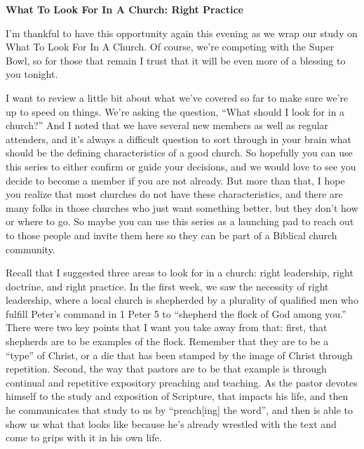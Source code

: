 \documentclass[letterpaper, 12pt]{article}
\begin{document}
    \thispagestyle{empty}

    \begin{center}

        \textbf{\large{What To Look For In A Church: Right Practice}}

    \end{center}

    I'm thankful to have this opportunity again this evening as we wrap
    our study on What To Look For In A Church. Of course, we're
    competing with the Super Bowl, so for those that remain I trust that
    it will be even more of a blessing to you tonight. 

    I want to review a little bit about what we've covered so far to
    make sure we're up to speed on things. We're asking the question,
    ``What should I look for in a church?'' And I noted that we have
    several new members as well as regular attenders, and it's always a
    difficult question to sort through in your brain what should be the
    defining characteristics of a good church. So hopefully you can use
    this series to either confirm or guide your decisions, and we would
    love to see you decide to become a member if you are not already.
    But more than that, I hope you realize that most churches do not
    have these characteristics, and there are many folks in those
    churches who just want something better, but they don't how or where
    to go. So maybe you can use this series as a launching pad to reach
    out to those people and invite them here so they can be part of a
    Biblical church community.

    Recall that I suggested three areas to look for in a church: right
    leadership, right doctrine, and right practice. In the first week,
    we saw the necessity of right leadership, where a local church is
    shepherded by a plurality of qualified men who fulfill Peter's
    command in 1 Peter 5 to ``shepherd the flock of God among you.''
    There were two key points that I want you take away from that:
    first, that shepherds are to be examples of the flock. Remember that
    they are to be a ``type'' of Christ, or a die that has been stamped
    by the image of Christ through repetition. Second, the way that
    pastors are to be that example is through continual and repetitive
    expository preaching and teaching. As the pastor devotes himself to
    the study and exposition of Scripture, that impacts his life, and
    then he communicates that study to us by ``preach[ing] the word'',
    and then is able to show us what that looks like because he's
    already wrestled with the text and come to grips with it in his own
    life.
\end{document}
